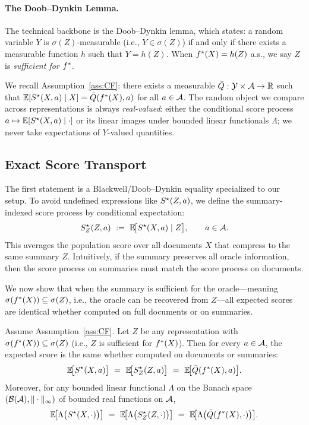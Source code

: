 \paragraph{The Doob--Dynkin Lemma.} The technical backbone is the Doob--Dynkin lemma, which states: a random variable $Y$ is $\sigma(Z)$-measurable (i.e., $Y \in \sigma(Z)$) if and only if there exists a measurable function $h$ such that $Y = h(Z)$. When $f^{\ast}(X) = h(Z)$ a.s., we say $Z$ is \emph{sufficient for $f^{\ast}$}.

We recall Assumption~\ref{ass:CF}: there exists a measurable $\bar Q:\mathcal{Y}\times\mathcal{A}\to\mathbb{R}$ such that
$\mathbb{E}[S^\star(X,a)\mid X]=\bar Q(f^{\ast}(X),a)$ for all $a\in\mathcal{A}$. The random object we compare across representations is always \emph{real-valued}: either the conditional score process $a\mapsto \mathbb{E}[S^\star(X,a)\mid \cdot]$ or its linear images under bounded linear functionals $\Lambda$; we never take expectations of $Y$-valued quantities.

\subsection{Exact Score Transport}

The first statement is a Blackwell/Doob–Dynkin equality specialized to our setup. To avoid undefined expressions like $S^\star(Z,a)$, we define the summary-indexed score process by conditional expectation:
\[
S^\star_Z(Z,a)\ :=\ \mathbb{E}\!\big[S^\star(X,a)\mid Z\big],
\qquad a\in\mathcal{A}.
\]
This averages the population score over all documents $X$ that compress to the same summary $Z$. Intuitively, if the summary preserves all oracle information, then the score process on summaries must match the score process on documents.

We now show that when the summary is sufficient for the oracle—meaning $\sigma(f^{\ast}(X))\subseteq\sigma(Z)$, i.e., the oracle can be recovered from $Z$—all expected scores are identical whether computed on full documents or on summaries.

\begin{lemma}
\label{lem:blackwell-transport-appendix}
Assume Assumption~\ref{ass:CF}. Let $Z$ be any representation with $\sigma(f^{\ast}(X))\subseteq\sigma(Z)$ (i.e., $Z$ is sufficient for $f^{\ast}(X)$).
Then for every $a\in\mathcal{A}$, the expected score is the same whether computed on documents or summaries:
\[
\E\!\big[\sstar(X,a)\big]\ =\ \E\!\big[\sstar_Z(Z,a)\big]\ =\ \E\!\big[\bar Q(\fstar(X),a)\big].
\]
Moreover, for any bounded linear functional $\Lambda$ on the Banach space $(\mathcal{B}(\mathcal{A}),\|\cdot\|_\infty)$ of bounded real functions on $\mathcal{A}$,
\[
\mathbb{E}\!\big[\Lambda\big(S^\star(X,\cdot)\big)\big]
\ =\
\mathbb{E}\!\big[\Lambda\big(S^\star_Z(Z,\cdot)\big)\big]
\ =\
\mathbb{E}\!\big[\Lambda\big(\bar Q(f^{\ast}(X),\cdot)\big)\big].
\]
\end{lemma}


